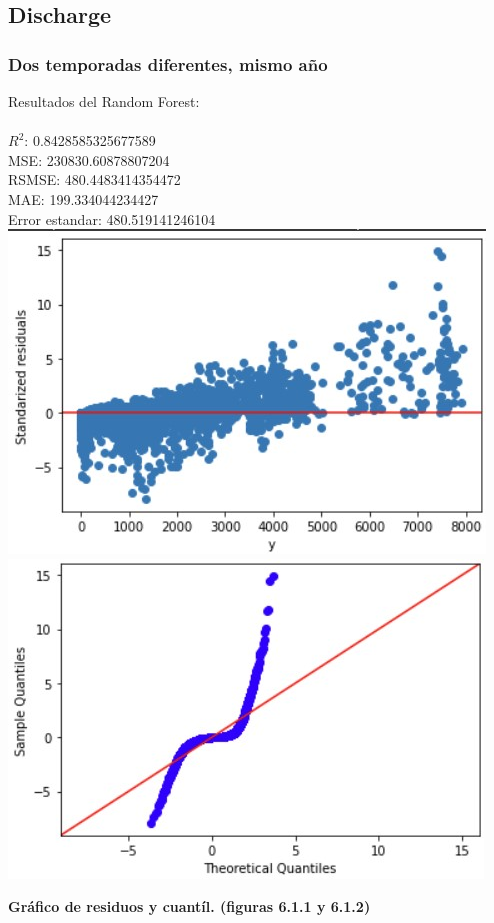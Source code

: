 \documentclass{article}
\begin{document}
    \subsection{Discharge}

        \subsubsection{Dos temporadas diferentes, mismo año}

            Resultados del Random Forest:\\
                    \\
                        $R^2$:  0.8428585325677589 \\
                        MSE:  230830.60878807204 \\
                        RSMSE:  480.4483414354472 \\
                        MAE:  199.334044234427 \\
                        Error estandar:  480.519141246104 \\
                
                        \includegraphics[scale=0.6]{images/RFR_After_DS.jpg} 
                        \includegraphics[scale=0.6]{images/RFR_After_DS_Q.jpg} \\
                        \begin{center}
                            \textbf{Gráfico de residuos y cuantíl. (figuras 6.1.1 y 6.1.2)}
                        \end{center}
                
\end{document}
